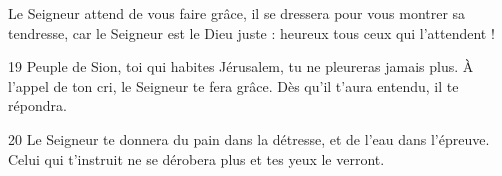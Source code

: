 Le Seigneur attend de vous faire grâce, il se dressera pour vous montrer sa tendresse, car le Seigneur est le Dieu juste : heureux tous ceux qui l’attendent !

19 Peuple de Sion, toi qui habites Jérusalem, tu ne pleureras jamais plus. À l’appel de ton cri, le Seigneur te fera grâce. Dès qu’il t’aura entendu, il te répondra.

20 Le Seigneur te donnera du pain dans la détresse, et de l’eau dans l’épreuve. Celui qui t’instruit ne se dérobera plus et tes yeux le verront.
